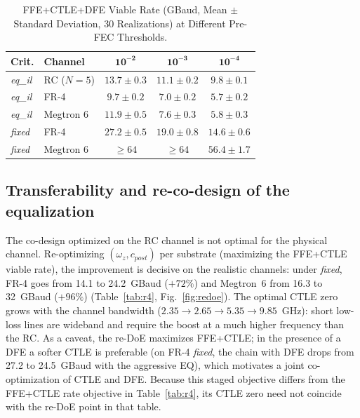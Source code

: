 \documentclass[twocolumn]{USG}
\begin{document}
\begin{table}[!t]
\caption{FFE+CTLE+DFE Viable Rate (GBaud, Mean $\pm$ Standard Deviation, 30
Realizations) at Different Pre-FEC Thresholds.}
\label{tab:rumbral}\centering
\begin{tabular}{llccc}
\hline
\textbf{Crit.} & \textbf{Channel} & $\mathbf{10^{-2}}$ & $\mathbf{10^{-3}}$ & $\mathbf{10^{-4}}$ \\
\hline
\textit{eq\_il} & RC ($N{=}5$)   & $13.7{\pm}0.3$ & $11.1{\pm}0.2$ & $9.8{\pm}0.1$ \\
\textit{eq\_il} & FR-4           & $9.7{\pm}0.2$  & $7.0{\pm}0.2$  & $5.7{\pm}0.2$ \\
\textit{eq\_il} & Megtron 6      & $11.9{\pm}0.5$ & $7.6{\pm}0.3$  & $5.8{\pm}0.3$ \\
\hline
\textit{fixed}  & FR-4           & $27.2{\pm}0.5$ & $19.0{\pm}0.8$ & $14.6{\pm}0.6$ \\
\textit{fixed}  & Megtron 6      & $\ge 64$       & $\ge 64$       & $56.4{\pm}1.7$ \\
\hline
\end{tabular}
\end{table}

\subsection{Transferability and re-co-design of the equalization}
The co-design optimized on the RC channel is not optimal for the physical
channel. Re-optimizing $(\omega_z, c_{post})$ per substrate (maximizing the
FFE+CTLE viable rate), the improvement is decisive on the realistic
channels: under \textit{fixed}, FR-4 goes from 14.1 to 24.2~GBaud ($+72\%$)
and Megtron~6 from 16.3 to 32~GBaud ($+96\%$) (Table~\ref{tab:r4},
Fig.~\ref{fig:redoe}). The optimal CTLE zero grows with the channel
bandwidth ($2.35\rightarrow2.65\rightarrow5.35\rightarrow9.85$~GHz): short
low-loss lines are wideband and require the boost at a much higher frequency
than the RC. As a caveat, the re-DoE maximizes FFE+CTLE; in the presence of
a DFE a softer CTLE is preferable (on FR-4 \textit{fixed}, the chain with
DFE drops from 27.2 to 24.5~GBaud with the aggressive EQ), which motivates a
joint co-optimization of CTLE and DFE. Because this staged objective differs
from the FFE+CTLE rate objective in Table~\ref{tab:r4}, its CTLE zero need
not coincide with the re-DoE point in that table.
\end{document}
